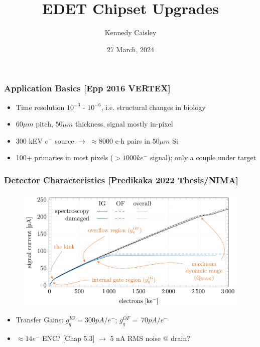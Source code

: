 \documentclass{beamer}
\title{EDET Chipset Upgrades}
\author{Kennedy Caisley}
\institute{University of Bonn}
\date{27 March, 2024}
\begin{document}
\beamertemplatenavigationsymbolsempty

\frame{\titlepage}


\begin{frame}
    \frametitle{Application Basics [Epp 2016 VERTEX]}
    \begin{itemize}
    \item Time resolution $10^{-3}$ - $10^{-6}$, i.e. structural changes in biology
    \item $60\mu m$ pitch, $50\mu m$ thickness, signal mostly in-pixel
    \item 300 kEV $e^-$ source $\rightarrow$ $\approx$8000 e-h pairs in $50\mu m$ Si
    \item 100+ primaries in most pixels ($>1000ke^-$ signal); only a couple under target

    \end{itemize}
\end{frame}

\begin{frame}
    \frametitle{Detector Characteristics [Predikaka 2022 Thesis/NIMA]}
    \begin{figure}
    \includegraphics[width=\textwidth]{response.png}
    \end{figure}
    \begin{itemize}
        \item Transfer Gains: $g_q^{IG}=300pA/e^-$;  $g_q^{OF}=~70pA/e^-$
        \item $\approx14e^-$ ENC? [Chap 5.3] $\rightarrow$ 5 nA RMS noise @ drain?
    \end{itemize}
\end{frame}
\end{document}
